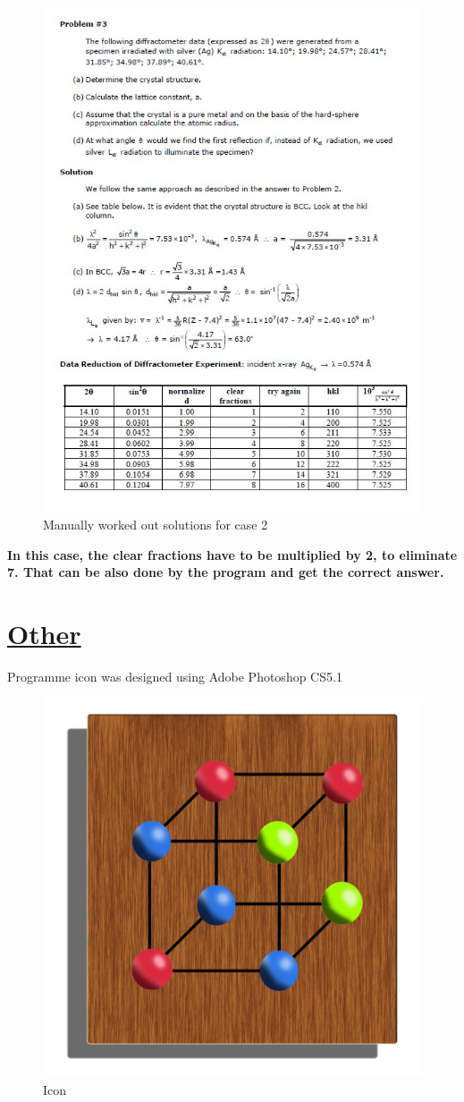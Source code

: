 \documentclass[a4paper]{article}
\begin{document}
\newpage
\begin{figure}[h!]
\centering
\includegraphics[width=450.4 px,height=536.8 px]{4}
\caption{Manually worked out solutions for case 2}
\end{figure}

\textbf{In this case, the clear fractions have to be multiplied by 2, to eliminate 7. That can be also done by the program and get the correct answer.}





\newpage
\section{\underline{Other}}
Programme icon was designed using Adobe Photoshop CS5.1

\begin{figure}[h!]
\centering
\includegraphics[width=400 px,height=400 px]{icon}
\caption{Icon}
\end{figure}

\newpage \ \newpage
\end{document}
